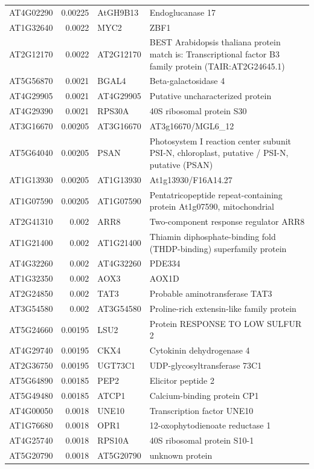 \documentclass[11pt]{article}
\begin{document}
\begin{center}
\begin{tabular}{lrll}
AT4G02290 & 0.00225 & AtGH9B13 & Endoglucanase 17\\
AT1G32640 & 0.0022 & MYC2 & ZBF1\\
AT2G12170 & 0.0022 & AT2G12170 & BEST Arabidopsis thaliana protein match is: Transcriptional factor B3 family protein (TAIR:AT2G24645.1)\\
AT5G56870 & 0.0021 & BGAL4 & Beta-galactosidase 4\\
AT4G29905 & 0.0021 & AT4G29905 & Putative uncharacterized protein\\
AT4G29390 & 0.0021 & RPS30A & 40S ribosomal protein S30\\
AT3G16670 & 0.00205 & AT3G16670 & AT3g16670/MGL6\_12\\
AT5G64040 & 0.00205 & PSAN & Photosystem I reaction center subunit PSI-N, chloroplast, putative / PSI-N, putative (PSAN)\\
AT1G13930 & 0.00205 & AT1G13930 & At1g13930/F16A14.27\\
AT1G07590 & 0.00205 & AT1G07590 & Pentatricopeptide repeat-containing protein At1g07590, mitochondrial\\
AT2G41310 & 0.002 & ARR8 & Two-component response regulator ARR8\\
AT1G21400 & 0.002 & AT1G21400 & Thiamin diphosphate-binding fold (THDP-binding) superfamily protein\\
AT4G32260 & 0.002 & AT4G32260 & PDE334\\
AT1G32350 & 0.002 & AOX3 & AOX1D\\
AT2G24850 & 0.002 & TAT3 & Probable aminotransferase TAT3\\
AT3G54580 & 0.002 & AT3G54580 & Proline-rich extensin-like family protein\\
AT5G24660 & 0.00195 & LSU2 & Protein RESPONSE TO LOW SULFUR 2\\
AT4G29740 & 0.00195 & CKX4 & Cytokinin dehydrogenase 4\\
AT2G36750 & 0.00195 & UGT73C1 & UDP-glycosyltransferase 73C1\\
AT5G64890 & 0.00185 & PEP2 & Elicitor peptide 2\\
AT5G49480 & 0.00185 & ATCP1 & Calcium-binding protein CP1\\
AT4G00050 & 0.0018 & UNE10 & Transcription factor UNE10\\
AT1G76680 & 0.0018 & OPR1 & 12-oxophytodienoate reductase 1\\
AT4G25740 & 0.0018 & RPS10A & 40S ribosomal protein S10-1\\
AT5G20790 & 0.0018 & AT5G20790 & unknown protein\\

\end{tabular}
\end{center}
\end{document}
